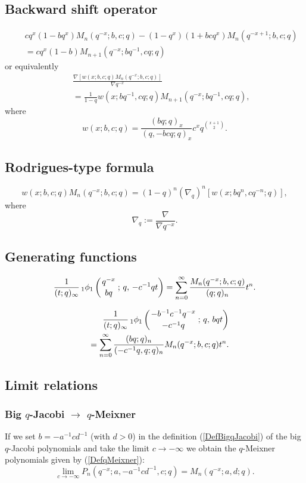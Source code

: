 \documentclass[envcountchap,graybox]{svmono}
\newcommand{\qhyp}[5]{\mbox{}_{#1}{\phi}_{#2}
\left(\genfrac{}{}{0pt}{}{#3}{#4}\,;\,q,\,#5\right)}
\newcommand{\qhyp}[5]{\,\mbox{}_{#1}\phi_{#2}\!\left(
  \genfrac{}{}{0pt}{}{#3}{#4};#5\right)}
\begin{document}
\subsection*{Backward shift operator}
\begin{eqnarray}
\label{shift2qMeixnerI}
& &cq^x(1-bq^x)M_n(q^{-x};b,c;q)-(1-q^x)(1+bcq^x)M_n(q^{-x+1};b,c;q)\nonumber\\
& &{}=cq^x(1-b)M_{n+1}(q^{-x};bq^{-1},cq;q)
\end{eqnarray}
or equivalently
\begin{eqnarray}
\label{shift2qMeixnerII}
& &\frac{\nabla\left[w(x;b,c;q)M_n(q^{-x};b,c;q)\right]}{\nabla q^{-x}}\nonumber\\
& &{}=\frac{1}{1-q}w(x;bq^{-1},cq;q)M_{n+1}(q^{-x};bq^{-1},cq;q),
\end{eqnarray}
where
$$w(x;b,c;q)=\frac{(bq;q)_x}{(q,-bcq;q)_x}c^xq^{\binom{x+1}{2}}.$$

\subsection*{Rodrigues-type formula}
\begin{equation}
\label{RodqMeixner}
w(x;b,c;q)M_n(q^{-x};b,c;q)=(1-q)^n\left(\nabla_q\right)^n\left[w(x;bq^n,cq^{-n};q)\right],
\end{equation}
where
$$\nabla_q:=\frac{\nabla}{\nabla q^{-x}}.$$

\subsection*{Generating functions}
\begin{equation}
\label{GenqMeixner1}
\frac{1}{(t;q)_{\infty}}\,\qhyp{1}{1}{q^{-x}}{bq}{-c^{-1}qt}
=\sum_{n=0}^{\infty}\frac{M_n(q^{-x};b,c;q)}{(q;q)_n}t^n.
\end{equation}

\begin{eqnarray}
\label{GenqMeixner2}
& &\frac{1}{(t;q)_{\infty}}\,\qhyp{1}{1}{-b^{-1}c^{-1}q^{-x}}{-c^{-1}q}{bqt}\nonumber\\
& &{}=\sum_{n=0}^{\infty}\frac{(bq;q)_n}{(-c^{-1}q,q;q)_n}M_n(q^{-x};b,c;q)t^n.
\end{eqnarray}

\subsection*{Limit relations}

\subsubsection*{Big $q$-Jacobi $\rightarrow$ $q$-Meixner}
If we set $b=-a^{-1}cd^{-1}$ (with $d>0$) in the definition (\ref{DefBigqJacobi})
of the big $q$-Jacobi polynomials and take the limit $c\rightarrow -\infty$ we
obtain the $q$-Meixner polynomials given by (\ref{DefqMeixner}):
\begin{equation}
\lim_{c\rightarrow -\infty}P_n(q^{-x};a,-a^{-1}cd^{-1},c;q)=M_n(q^{-x};a,d;q).
\end{equation}
\end{document}
